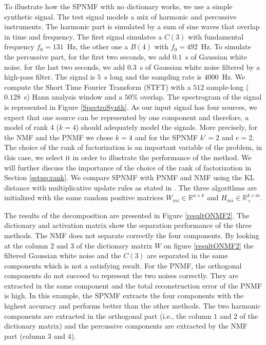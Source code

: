\documentclass[journal]{IEEEtran}
\begin{document}
To illustrate how the SPNMF with no dictionary works, we use a simple synthetic signal. The test signal models a mix of harmonic and percussive instruments. The harmonic part is simulated by a sum of sine waves that overlap in time and frequency. The first signal simulates a $C(3)$ with fundamental frequency $f_0 = 131$~Hz, the other one a $B(4)$ with $f_0 = 492$~Hz. To simulate the percussive part, for the first two seconds, we add $0.1$~s of Gaussian white noise. for the last two seconds, we add $0.3$~s of Gaussian white noise filtered by a high-pass filter. The signal is $5$~s long and the sampling rate is $4000$~Hz. We compute the Short Time Fourier Transform (STFT) with a $512$ sample-long ($0.128$~s) Hann analysis window and a $50\%$ overlap. The spectrogram of the signal is represented in Figure \ref{SpectroSynth}. As our input signal has four sources, we expect that one source can be represented by one component and therefore, a model of rank 4 ($k=4$) should adequately model the signals. More precisely, for the NMF and the PNMF we chose $k=4$ and for the SPNMF $k'=2$ and $e=2$. The choice of the rank of factorization is an important variable of the problem, in this case, we select it in order to illustrate the performance of the method. We will further discuss the importance of the choice of the rank of factorization in Section \ref{setup:rank}. We compare SPNMF with PNMF and NMF using the KL distance with multiplicative update rules as stated in \cite{fevotte2009nonnegative}. The three algorithms are initialized with the same random positive matrices $W_{ini} \in \mathbb{R}^{n \times k}$  and $ H_{ini} \in \mathbb{R}^{k \times m}_{+} $.

The results of the decomposition are presented in Figure \ref{resultONMF2}. The dictionary and activation matrix show the separation performance of the three methods. The NMF does not separate correctly the four components. By looking at the column $2$ and $3$ of the dictionary matrix $W$ on figure \ref{resultONMF2} the filtered Gaussian white noise and the $C(3)$ are separated in the same components which is not a satisfying result.
For the PNMF, the orthogonal components do not succeed to represent the two noises correctly. They are extracted in the same component and the total reconstruction error of the PNMF is high.
In this example, the SPNMF extracts the four components with the highest accuracy and performs better than the other methods. The two harmonic components are extracted in the orthogonal part (i.e., the column $1$ and $2$ of the dictionary matrix) and the percussive components are extracted by the NMF part (column $3$ and $4$).
\end{document}
